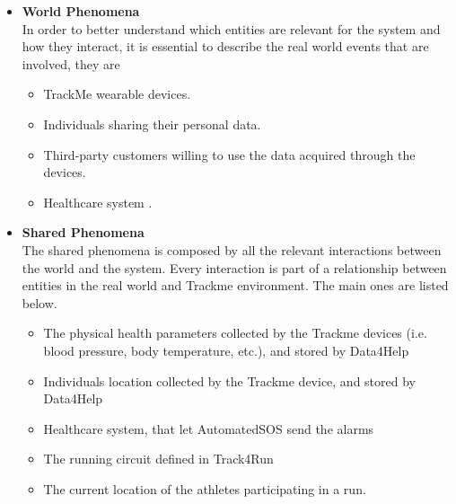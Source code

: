 \documentclass[12pt]{article}
\begin{document}
\begin{itemize}
\item \textbf{World Phenomena}
\\
In order to better understand which entities are relevant for the system and how they interact, it is essential to describe the real world events that are involved, they are
\begin{itemize}
\item{} TrackMe wearable devices.
\item{} Individuals sharing their personal data.
\item{} Third-party customers willing to use the data acquired through the devices.
\item{} Healthcare system .
\end{itemize}

\item \textbf{Shared Phenomena}
\\
The shared phenomena is composed by all the relevant interactions between the world and the system. Every interaction is part of a relationship between entities in the real world and Trackme environment. The main ones are listed below.
\begin{itemize}
\item{} The physical health parameters collected by the Trackme devices (i.e. blood pressure, body temperature, etc.), and stored by Data4Help
\item{} Individuals location collected by the Trackme device, and stored by Data4Help
\item{} Healthcare system, that let AutomatedSOS send the alarms
\item{} The running circuit defined in Track4Run
\item{} The current location of the athletes participating in a run.
\end{itemize}
\end{itemize}
\end{document}
